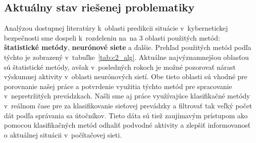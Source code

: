 \documentclass[thesismargins, thesislinespacing, openright, upjsfrontpage]{rnthesis}
\begin{document}

\subsection{Aktuálny stav riešenej problematiky}

Analýzou dostupnej literatúry k~oblasti predikcii situácie v~kybernetickej bezpečnosti sme dospeli k~rozdeleniu na~na 3 oblasti použitých metód:
\textbf{štatistické metódy}, \textbf{neurónové siete} a ďalšie. Prehľad použitých metód podľa týchto je zobrazený v~tabuľke~\ref{tab:c2_alg}. Aktuálne najvýznamnejšou oblasťou sú štatistické metódy, avšak v~posledných rokoch je možné pozorovať nárast výskumnej aktivity v~oblasti neurónových sietí. Obe tieto oblasti sú vhodné pre porovnanie našej práce a potvrdenie využitia týchto metód pre spracovanie v~nepretržitých prevádzkach. Našli sme aj práce využívajúce klasifikačné metódy v~reálnom čase pre za klasifikovanie sieťovej prevádzky a filtrovať tak veľký počet dát podľa správania sa útočníkov. Tieto dáta sú tiež zaujímavým prístupom ako pomocou klasifikačných metód odhaliť podvodné aktivity a zlepšiť informovanosť o aktuálnej situácii v~počítačovej sieti.
\end{document}

